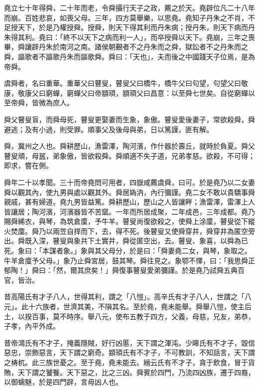 \begin{pinyinscope}
堯立七十年得舜，二十年而老，令舜攝行天子之政，薦之於天。堯辟位凡二十八年而崩。百姓悲哀，如喪父母。三年，四方莫舉樂，以思堯。堯知子丹朱之不肖，不足授天下，於是乃權授舜。授舜，則天下得其利而丹朱病；授丹朱，則天下病而丹朱得其利。堯曰：「終不以天下之病而利一人」，而卒授舜以天下。堯崩，三年之喪畢，舜讓辟丹朱於南河之南。諸侯朝覲者不之丹朱而之舜，獄訟者不之丹朱而之舜，謳歌者不謳歌丹朱而謳歌舜。舜曰：「天也」，夫而後之中國踐天子位焉，是為帝舜。

虞舜者，名曰重華。重華父曰瞽叟，瞽叟父曰橋牛，橋牛父曰句望，句望父曰敬康，敬康父曰窮蟬，窮蟬父曰帝顓頊，顓頊父曰昌意：以至舜七世矣。自從窮蟬以至帝舜，皆微為庶人。

舜父瞽叟盲，而舜母死，瞽叟更娶妻而生象，象傲。瞽叟愛後妻子，常欲殺舜，舜避逃；及有小過，則受罪。順事父及後母與弟，日以篤謹，匪有解。

舜，冀州之人也。舜耕歷山，漁雷澤，陶河濱，作什器於壽丘，就時於負夏。舜父瞽叟頑，母嚚，弟象傲，皆欲殺舜。舜順適不失子道，兄弟孝慈。欲殺，不可得；即求，嘗在側。

舜年二十以孝聞。三十而帝堯問可用者，四嶽咸薦虞舜，曰可。於是堯乃以二女妻舜以觀其內，使九男與處以觀其外。舜居媯汭，內行彌謹。堯二女不敢以貴驕事舜親戚，甚有婦道。堯九男皆益篤。舜耕歷山，歷山之人皆讓畔；漁雷澤，雷澤上人皆讓居；陶河濱，河濱器皆不苦窳。一年而所居成聚，二年成邑，三年成都。堯乃賜舜絺衣，與琴，為筑倉廩，予牛羊。瞽叟尚復欲殺之，使舜上涂廩，瞽叟從下縱火焚廩。舜乃以兩笠自捍而下，去，得不死。後瞽叟又使舜穿井，舜穿井為匿空旁出。舜既入深，瞽叟與象共下土實井，舜從匿空出，去。瞽叟、象喜，以舜為已死。象曰：「本謀者象。」象與其父母分，於是曰：「舜妻堯二女，與琴，象取之。牛羊倉廩予父母。」象乃止舜宮居，鼓其琴。舜往見之。象鄂不懌，曰：「我思舜正郁陶！」舜曰：「然，爾其庶矣！」舜復事瞽叟愛弟彌謹。於是堯乃試舜五典百官，皆治。

昔高陽氏有才子八人，世得其利，謂之「八愷」。高辛氏有才子八人，世謂之「八元」。此十六族者，世濟其美，不隕其名。至於堯，堯未能舉。舜舉八愷，使主后土，以揆百事，莫不時序。舉八元，使布五教于四方，父義，母慈，兄友，弟恭，子孝，內平外成。

昔帝鴻氏有不才子，掩義隱賊，好行凶慝，天下謂之渾沌。少暤氏有不才子，毀信惡忠，崇飾惡言，天下謂之窮奇。顓頊氏有不才子，不可教訓，不知話言，天下謂之梼杌。此三族世憂之。至于堯，堯未能去。縉云氏有不才子，貪于飲食，冒于貨賄，天下謂之饕餮。天下惡之，比之三凶。舜賓於四門，乃流四凶族，遷于四裔，以御螭魅，於是四門辟，言毋凶人也。


\end{pinyinscope}
